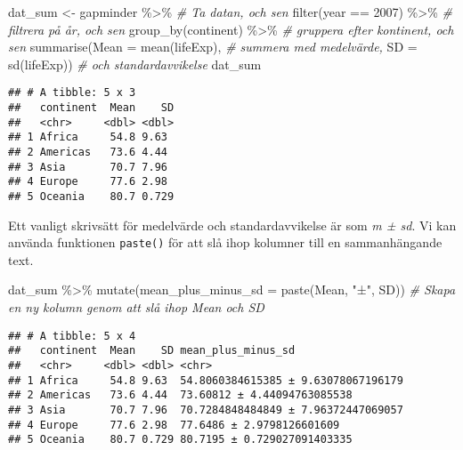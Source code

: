 \documentclass[
]{book}
\newenvironment{Shaded}{\begin{snugshade}}{\end{snugshade}}
\newcommand{\AttributeTok}[1]{\textcolor[rgb]{0.77,0.63,0.00}{#1}}
\newcommand{\CommentTok}[1]{\textcolor[rgb]{0.56,0.35,0.01}{\textit{#1}}}
\newcommand{\DecValTok}[1]{\textcolor[rgb]{0.00,0.00,0.81}{#1}}
\newcommand{\FunctionTok}[1]{\textcolor[rgb]{0.00,0.00,0.00}{#1}}
\newcommand{\NormalTok}[1]{#1}
\newcommand{\OtherTok}[1]{\textcolor[rgb]{0.56,0.35,0.01}{#1}}
\newcommand{\SpecialCharTok}[1]{\textcolor[rgb]{0.00,0.00,0.00}{#1}}
\newcommand{\StringTok}[1]{\textcolor[rgb]{0.31,0.60,0.02}{#1}}
\theoremstyle{definition}
\theoremstyle{definition}
\theoremstyle{definition}
\theoremstyle{definition}
\theoremstyle{remark}
\begin{document}
\begin{Shaded}
\begin{Highlighting}[]
\NormalTok{dat\_sum }\OtherTok{\textless{}{-}}\NormalTok{ gapminder }\SpecialCharTok{\%\textgreater{}\%}                         \CommentTok{\# Ta datan, och sen}
  \FunctionTok{filter}\NormalTok{(year }\SpecialCharTok{==} \DecValTok{2007}\NormalTok{) }\SpecialCharTok{\%\textgreater{}\%}                       \CommentTok{\# filtrera på år, och sen}
  \FunctionTok{group\_by}\NormalTok{(continent) }\SpecialCharTok{\%\textgreater{}\%}                        \CommentTok{\# gruppera efter kontinent, och sen}
  \FunctionTok{summarise}\NormalTok{(}\AttributeTok{Mean =} \FunctionTok{mean}\NormalTok{(lifeExp),                }\CommentTok{\# summera med medelvärde,}
            \AttributeTok{SD =} \FunctionTok{sd}\NormalTok{(lifeExp))                    }\CommentTok{\# och standardavvikelse}
\NormalTok{dat\_sum}
\end{Highlighting}
\end{Shaded}

\begin{verbatim}
## # A tibble: 5 x 3
##   continent  Mean    SD
##   <chr>     <dbl> <dbl>
## 1 Africa     54.8 9.63 
## 2 Americas   73.6 4.44 
## 3 Asia       70.7 7.96 
## 4 Europe     77.6 2.98 
## 5 Oceania    80.7 0.729
\end{verbatim}

Ett vanligt skrivsätt för medelvärde och standardavvikelse är som \emph{m ± sd}. Vi kan använda funktionen \texttt{paste()} för att slå ihop kolumner till en sammanhängande text.

\begin{Shaded}
\begin{Highlighting}[]
\NormalTok{dat\_sum }\SpecialCharTok{\%\textgreater{}\%} 
  \FunctionTok{mutate}\NormalTok{(}\AttributeTok{mean\_plus\_minus\_sd =} \FunctionTok{paste}\NormalTok{(Mean, }\StringTok{"±"}\NormalTok{, SD))        }\CommentTok{\# Skapa en ny kolumn genom att slå ihop Mean och SD}
\end{Highlighting}
\end{Shaded}

\begin{verbatim}
## # A tibble: 5 x 4
##   continent  Mean    SD mean_plus_minus_sd                 
##   <chr>     <dbl> <dbl> <chr>                              
## 1 Africa     54.8 9.63  54.8060384615385 ± 9.63078067196179
## 2 Americas   73.6 4.44  73.60812 ± 4.44094763085538        
## 3 Asia       70.7 7.96  70.7284848484849 ± 7.96372447069057
## 4 Europe     77.6 2.98  77.6486 ± 2.9798126601609          
## 5 Oceania    80.7 0.729 80.7195 ± 0.729027091403335
\end{verbatim}
\end{document}
